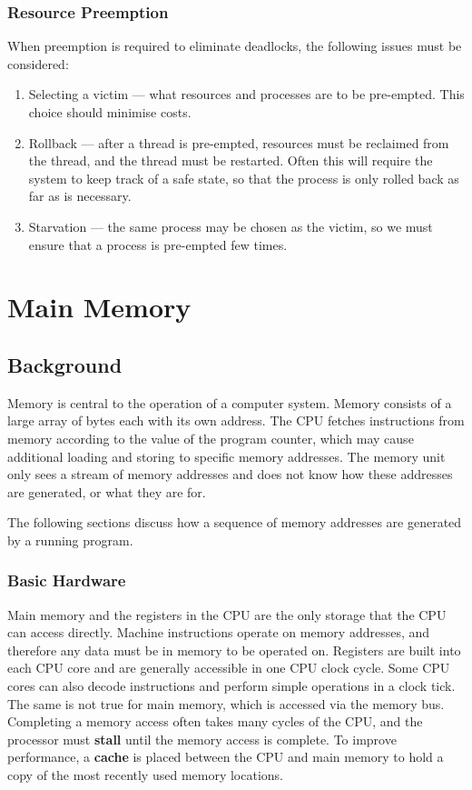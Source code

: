 \documentclass{article}
\begin{document}
\subsubsection{Resource Preemption}
When preemption is required to eliminate deadlocks, the following
issues must be considered:
\begin{enumerate}
    \item Selecting a victim --- what resources and processes are to be
          pre-empted. This choice should minimise costs.
    \item Rollback --- after a thread is pre-empted, resources must be
          reclaimed from the thread, and the thread must be restarted.
          Often this will require the system to keep track of a safe
          state, so that the process is only rolled back as far as is
          necessary.
    \item Starvation --- the same process may be chosen as the victim,
          so we must ensure that a process is pre-empted few times.
\end{enumerate}
\section{Main Memory}
\subsection{Background}
Memory is central to the operation of a computer system. Memory
consists of a large array of bytes each with its own address. The CPU
fetches instructions from memory according to the value of the program
counter, which may cause additional loading and storing to specific
memory addresses. The memory unit only sees a stream of memory
addresses and does not know how these addresses are generated, or what
they are for.

The following sections discuss how a sequence of memory addresses are
generated by a running program.
\subsubsection{Basic Hardware}
Main memory and the registers in the CPU are the only storage that the
CPU can access directly. Machine instructions operate on memory
addresses, and therefore any data must be in memory to be operated on.
Registers are built into each CPU core and are generally accessible in
one CPU clock cycle. Some CPU cores can also decode instructions and
perform simple operations in a clock tick. The same is not true for
main memory, which is accessed via the memory bus. Completing a memory
access often takes many cycles of the CPU, and the processor must
\textbf{stall} until the memory access is complete. To improve
performance, a \textbf{cache} is placed between the CPU and main memory
to hold a copy of the most recently used memory locations.
\end{document}
